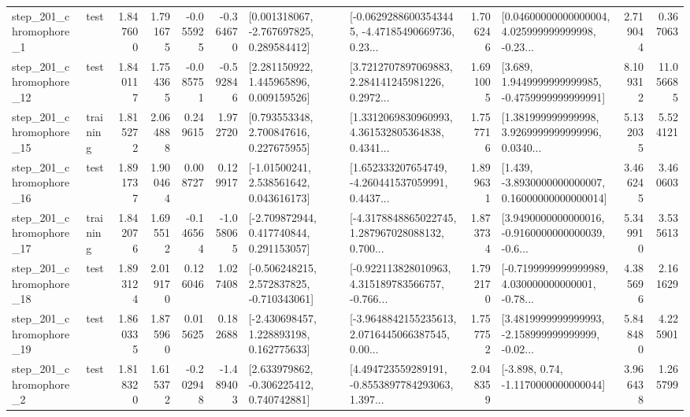 \begin{tabular}{llrrrrllrlrr}
   step\_201\_chromophore\_1 &      test &      1.847600 &    1.791675 &     -0.055925 & -0.364670 &    [0.001318067, -2.767697825, 0.289584412] &  [-0.06292886003543445, -4.47185490669736, 0.23... &       1.706246 &  [0.04600000000000004, 4.025999999999998, -0.23... &            2.719044 &          0.367063 \\
  step\_201\_chromophore\_12 &      test &      1.840117 &    1.754365 &     -0.085751 & -0.592846 &     [2.281150922, 1.445965896, 0.009159526] &  [3.7212707897069883, 2.284141245981226, 0.2972... &       1.691005 &   [3.689, 1.9449999999999985, -0.4759999999999991] &            8.109312 &         11.056685 \\
  step\_201\_chromophore\_15 &  training &      1.815272 &    2.064888 &      0.249615 &  1.972720 &     [0.793553348, 2.700847616, 0.227675955] &  [1.3312069830960993, 4.361532805364838, 0.4341... &       1.757716 &  [1.381999999999998, 3.9269999999999996, 0.0340... &            5.132035 &          5.524121 \\
  step\_201\_chromophore\_16 &      test &      1.891737 &    1.900464 &      0.008727 &  0.129917 &     [-1.01500241, 2.538561642, 0.043616173] &  [1.652333207654749, -4.260441537059991, 0.4437... &       1.899631 &  [1.439, -3.8930000000000007, 0.16000000000000014] &            3.466245 &          3.460603 \\
  step\_201\_chromophore\_17 &  training &      1.842076 &    1.695512 &     -0.146564 & -1.058065 &    [-2.709872944, 0.417740844, 0.291153057] &  [-4.3178848865022745, 1.287967028088132, 0.700... &       1.873734 &  [3.9490000000000016, -0.9160000000000039, -0.6... &            5.349910 &          3.535613 \\
  step\_201\_chromophore\_18 &      test &      1.893124 &    2.019170 &      0.126046 &  1.027408 &   [-0.506248215, 2.572837825, -0.710343061] &  [-0.922113828010963, 4.315189783566757, -0.766... &       1.792170 &  [-0.7199999999999989, 4.030000000000001, -0.78... &            4.385696 &          2.161629 \\
  step\_201\_chromophore\_19 &      test &      1.860335 &    1.875960 &      0.015625 &  0.182688 &    [-2.430698457, 1.228893198, 0.162775633] &  [-3.9648842155235613, 2.0716445066387545, 0.00... &       1.757752 &  [3.4819999999999993, -2.158999999999999, -0.02... &            5.848480 &          4.225901 \\
   step\_201\_chromophore\_2 &      test &      1.818320 &    1.615372 &     -0.202948 & -1.489403 &    [2.633979862, -0.306225412, 0.740742881] &  [4.494723559289191, -0.8553897784293063, 1.397... &       2.048359 &                [-3.898, 0.74, -1.1170000000000044] &            3.966438 &          1.265799 \\

\end{tabular}
